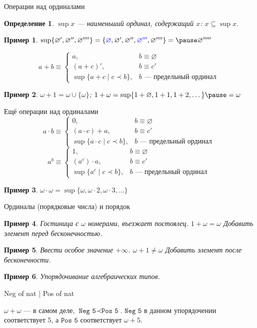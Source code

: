 \documentclass[aspectratio=169]{beamer}
\newtheorem{dfn}{Определение}[section]
\newtheorem{exm}{Пример}[section]
\begin{document}
\begin{frame}{Операции над ординалами}
\begin{dfn}$\sup x$ --- наименьший ординал, содержащий $x$: $x \subseteq \sup x$.\end{dfn} \pause
\begin{exm}$\sup \{ \varnothing', \varnothing'', \varnothing'''' \} = \{ {\color{blue}\varnothing},
   \varnothing', \varnothing'', {\color{blue} \varnothing '''}, \varnothing'''' \} = \pause \varnothing'''''$\end{exm} \pause
$$a + b \equiv \left\{ \begin{array}{rl} 
   a, & b \equiv \varnothing\\
   (a + c)', & b \equiv c'\\
   \sup \{ a+c \mid c \prec b \}, &\mbox{$b$ --- предельный ординал }\end{array}\right.$$\pause

\begin{exm}$\omega + 1 = \omega \cup \{\omega\}$; \pause $1 + \omega = \sup\{ 1+\varnothing, 1+1, 1+2, \dots \} \pause = \omega$\end{exm}
\end{frame}

\begin{frame}{Ещё операции над ординалами}
$$a \cdot b \equiv \left\{ \begin{array}{rl} 
   0, & b \equiv \varnothing\\
   (a \cdot c) + a, & b \equiv c'\\
   \sup \{ a \cdot c \mid c \prec b \}, &\mbox{$b$ --- предельный ординал }\end{array}\right.$$
\pause
$$a ^ b \equiv \left\{ \begin{array}{rl} 
   1, & b \equiv \varnothing\\
   (a ^ c) \cdot a, & b \equiv c'\\
   \sup \{ a^c \mid c \prec b \}, &\mbox{$b$ --- предельный ординал }\end{array}\right.$$
\pause
\begin{exm}$\omega \cdot \omega = \sup\{\omega,\omega\cdot 2, \omega\cdot 3, \dots\}$\end{exm}
\end{frame}

\begin{frame}{Ординалы (порядковые числа) и порядок}
\begin{exm}Гостиница с $\omega$ номерами, въезжает постоялец. \pause $1 + \omega = \omega$ \pause Добавить элемент перед бесконечностью.\end{exm}
\begin{exm}Ввести особое значение $+\infty$. \pause $\omega + 1 \ne \omega$ \pause Добавить элемент после бесконечности.\end{exm} \pause
\begin{exm}Упорядочивание алгебраических типов.\end{exm} \pause 
Neg of nat | Pos of nat \pause 

$\omega + \omega$ --- в самом деле, $\texttt{Neg 5} \prec \texttt{Pos 5}$. $\texttt{Neg 5}$ в данном упорядочении
соответствует $5$, а $\texttt{Pos 5}$ соответствует $\omega + 5$.
\end{frame}
\end{document}
